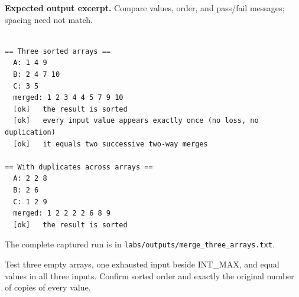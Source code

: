 \textbf{Expected output excerpt.} Compare values, order, and pass/fail messages; spacing need not match.

\begin{lstlisting}[style=utpterminal,language={}]

== Three sorted arrays ==
  A: 1 4 9
  B: 2 4 7 10
  C: 3 5
  merged: 1 2 3 4 4 5 7 9 10
  [ok]   the result is sorted
  [ok]   every input value appears exactly once (no loss, no duplication)
  [ok]   it equals two successive two-way merges

== With duplicates across arrays ==
  A: 2 2 8
  B: 2 6
  C: 1 2 9
  merged: 1 2 2 2 2 6 8 9
  [ok]   the result is sorted

\end{lstlisting}

The complete captured run is in \texttt{labs/outputs/merge\_three\_arrays.txt}.

\begin{tryit}

Test three empty arrays, one exhausted input beside INT\_MAX, and equal values in all three inputs. Confirm sorted order and exactly the original number of copies of every value.

\end{tryit}
